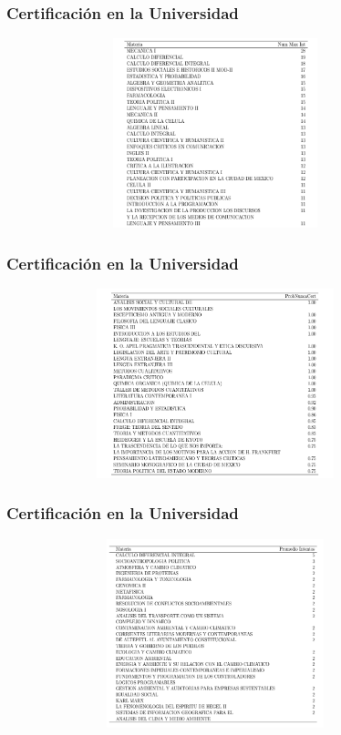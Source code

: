\documentclass[xcolor=dvipsnames]{beamer}
\begin{document}
\begin{frame}\frametitle{Certificaci\'on en la Universidad}
\textbf{
}
\begin{figure}[H]
\centering
\includegraphics[width=10cm,height=5.5cm]{Tablas/MateriasMaxIntSiCert.png}
\end{figure}
\end{frame}


\begin{frame}\frametitle{Certificaci\'on en la Universidad}
\textbf{
}
\begin{figure}[H]
\centering
\includegraphics[width=10cm,height=5.5cm]{Tablas/MateriasNoCert.png}
\end{figure}
\end{frame}


\begin{frame}\frametitle{Certificaci\'on en la Universidad}
\textbf{
}
\begin{figure}[H]
\centering
\includegraphics[width=10cm,height=5.5cm]{Tablas/MateriasPromSiCert.png}
\end{figure}
\end{frame}
\end{document}

